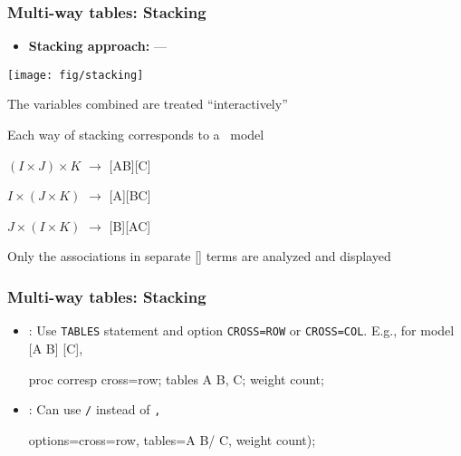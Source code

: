 \begin{frame}
  \frametitle{Multi-way tables: Stacking}
  \begin{itemize}
	\item{\large\bfseries Stacking approach:} \citet{HeijdenLeeuw:85}--- 
 \end{itemize}

 \begin{minipage}[c]{.49\linewidth}
  \texttt{[image: fig/stacking]}
 \end{minipage}%
 \hfill
 \begin{minipage}[c]{.49\linewidth}
       \begin{itemize*}
	  \item The variables combined are treated ``interactively''
	  \item Each way of stacking corresponds to a \loglin\ model
    	\begin{itemize*}
		\item \((I \times  J ) \times  K\) $\rightarrow$ [AB][C]
		\item \(I \times  ( J \times  K )\) $\rightarrow$ [A][BC]
		\item \(J \times  ( I \times  K )\) $\rightarrow$ [B][AC]
		\end{itemize*}
	  \item Only the associations in separate [] terms are analyzed and displayed
	  \end{itemize*}
\end{minipage}
\end{frame}

\begin{frame}[fragile]
  \frametitle{Multi-way tables: Stacking}
  \begin{itemize}
	\item{\large\bfseries {}}:  Use \texttt{TABLES} statement and option
	\texttt{CROSS=ROW} or \texttt{CROSS=COL}.  E.g., for model [A B] [C],
\begin{listing}
proc corresp cross=row;
   tables A B, C;
   weight count;
\end{listing}

	\item{\large\bfseries {}}: Can use \verb|/| instead of \verb|,|
\begin{listing}
   options=cross=row,
   tables=A B/ C,
   weight count);
\end{listing}
  \end{itemize}

\end{frame}

